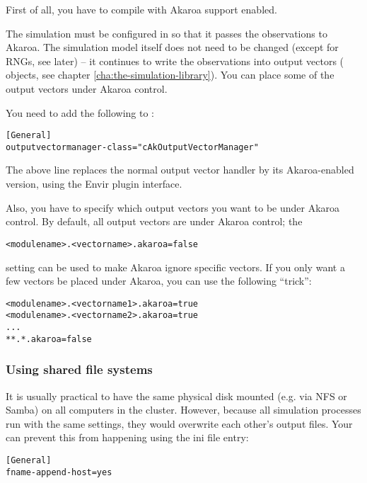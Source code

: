 First of all, you have to compile {\opp} with Akaroa support enabled.

The {\opp} simulation must be configured in 
so that it passes the observations to Akaroa. The simulation model itself does
not need to be changed (except for RNGs, see later) -- it continues to write
the observations into output vectors ( objects,
see chapter \ref{cha:the-simulation-library}). You can place some of
the output vectors under Akaroa control.

You need to add the following to :

\begin{verbatim}
[General]
outputvectormanager-class="cAkOutputVectorManager"
\end{verbatim}

The above line replaces the normal output vector handler
by its Akaroa-enabled version, using the Envir plugin interface.

Also, you have to specify which output vectors you want to
be under Akaroa control. By default, all output vectors are under Akaroa
control; the

\begin{verbatim}
<modulename>.<vectorname>.akaroa=false
\end{verbatim}

setting can be used to make Akaroa ignore specific vectors.
If you only want a few vectors be placed under Akaroa,
you can use the following ``trick'':

\begin{verbatim}
<modulename>.<vectorname1>.akaroa=true
<modulename>.<vectorname2>.akaroa=true
...
**.*.akaroa=false
\end{verbatim}


\subsubsection{Using shared file systems}

It is usually practical to have the same physical disk mounted (e.g. via NFS or Samba)
on all computers in the cluster. However, because all {\opp} simulation
processes run with the same settings, they would overwrite each other's
output files. Your can prevent this from happening using the
 ini file entry:

\begin{verbatim}
[General]
fname-append-host=yes
\end{verbatim}

